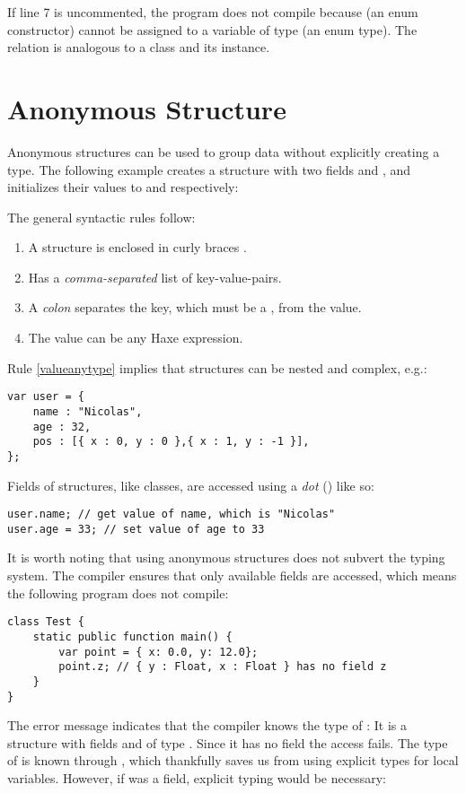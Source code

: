 \documentclass{haxe}
\begin{document}
If line 7 is uncommented, the program does not compile because  (an enum constructor) cannot be assigned to a variable of type  (an enum type). The relation is analogous to a class and its instance.



\section{Anonymous Structure}
\label{types-anonymous-structure}

Anonymous structures can be used to group data without explicitly creating a type. The following example creates a structure with two fields  and , and initializes their values to  and  respectively:

The general syntactic rules follow:

\begin{enumerate}
	\item A structure is enclosed in curly braces \expr{$\left\{\right\}$}. 
	\item Has a \emph{comma-separated} list of key-value-pairs.
	\item A \emph{colon} separates the key, which must be a , from the value.
	\item\label{valueanytype} The value can be any Haxe expression.
\end{enumerate}
Rule \ref{valueanytype} implies that structures can be nested and complex, e.g.:

\begin{lstlisting}
var user = {
    name : "Nicolas",
    age : 32,
    pos : [{ x : 0, y : 0 },{ x : 1, y : -1 }],
};
\end{lstlisting}
Fields of structures, like classes, are accessed using a \emph{dot} () like so:

\begin{lstlisting}
user.name; // get value of name, which is "Nicolas"
user.age = 33; // set value of age to 33
\end{lstlisting}
It is worth noting that using anonymous structures does not subvert the typing system. The compiler ensures that only available fields are accessed, which means the following program does not compile:

\begin{lstlisting}
class Test {
	static public function main() {
		var point = { x: 0.0, y: 12.0};
		point.z; // { y : Float, x : Float } has no field z
	}
}
\end{lstlisting}
The error message indicates that the compiler knows the type of : It is a structure with fields  and  of type . Since it has no field  the access fails.
The type of  is known through , which thankfully saves us from using explicit types for local variables. However, if  was a field, explicit typing would be necessary:
\end{document}
